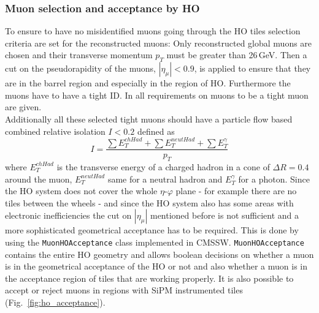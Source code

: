 		\subsubsection{Muon selection and acceptance by HO}
		\label{thesectionhere}
			To ensure to have no misidentified muons going through the HO tiles selection criteria are set for the reconstructed muons:
			Only reconstructed global muons are chosen and their transverse momentum $p_T$ must be greater than 26\,GeV.
			Then a cut on the pseudorapidity of the muons, $|\eta_\mu| < 0.9$, is applied to ensure that they are in the barrel region and especially in the region of HO.
			Furthermore the muons have to have a tight ID.
			In \cite{CMS-PAPER-MUO-10-004} all requirements on muons to be a tight muon are given. \\
			Additionally all these selected tight muons should have a particle flow based combined relative isolation $I<0.2$ defined as
			\begin{equation}
				I = \frac{\sum{E_T^{chHad}} + \sum{E_T^{neutHad}} + \sum{E_T^\gamma}}{p_T}
			\end{equation}
			where $E_T^{chHad}$ is the transverse energy of a charged hadron in a cone of $\Delta R = 0.4$ around the muon, $E_T^{neutHad}$ same for a neutral hadron and $E_T^\gamma$ for a photon.
			Since the HO system does not cover the whole $\eta$-$\varphi$ plane - for example there are no tiles between the wheels - and since the HO system also has some areas with electronic inefficiencies
			the cut on $|\eta_{\mu}|$ mentioned before is not sufficient and a more sophisticated geometrical acceptance has to be required.
			This is done by using the \verb+MuonHOAcceptance+ class implemented in CMSSW.
			\verb+MuonHOAcceptance+ contains the entire HO geometry and allows boolean decisions on whether a muon is in the geometrical acceptance of the HO or not and also whether a muon is in the
			acceptance region of tiles that are working properly.
			It is also possible to accept or reject muons in regions with SiPM instrumented tiles (Fig.\ \ref{fig:ho_acceptance}). \\
